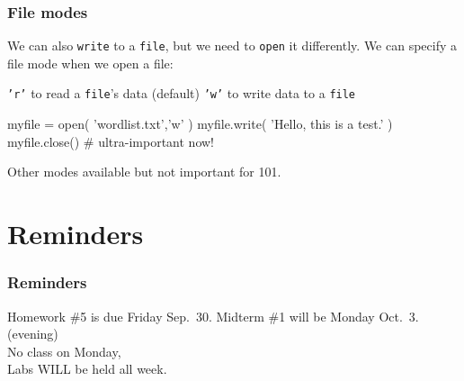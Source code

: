 \documentclass[11pt]{beamer}
\begin{document}
\begin{frame}[fragile]
  \frametitle{File modes}
  \Enlarge

  \begin{itemize}
  \myitem  We can also \texttt{write} to a \texttt{file}, but we need to \texttt{open} it differently.
  \myitem  We can specify a file mode when we open a file:
    \begin{itemize}
    \mysubitem  \texttt{'r'} to read a \texttt{file}'s data (default)
    \mysubitem  \texttt{'w'} to write data to a \texttt{file}
    \end{itemize}
  \end{itemize}
  \begin{semiverbatim}
myfile = open( 'wordlist.txt','w' )
myfile.write( 'Hello, this is a test.' )
myfile.close()  # ultra-important now!
  \end{semiverbatim}
  \begin{itemize}
  \myitem  Other modes available but not important for 101.
  \end{itemize}
\end{frame}


\section{Reminders}

\begin{frame}
  \frametitle{Reminders}
  \Enlarge

  \begin{itemize}
  \myitem  Homework \#5 is due Friday Sep.\ 30.
  \myitem  Midterm \#1 will be Monday Oct.\ 3.  (evening) \\ \textcolor{CS101GradBot}{No class on Monday, \\ Labs WILL be held all week.}
  \end{itemize}
\end{frame}
\end{document}
